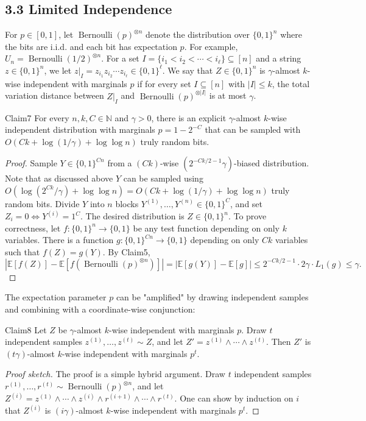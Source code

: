 \subsection*{3.3 Limited Independence}
For $p\in[0,1]$, let $\operatorname{Bernoulli}(p)^{\otimes n}$ denote the distribution over $\{0,1\}^n$ where the bits are i.i.d. and each bit has expectation $p$. For example, $U_n=\operatorname{Bernoulli}(1/2)^{\otimes n}$. For a set $I=\{i_1<i_2<\cdots<i_\ell\}\subseteq[n]$ and a string $z\in\{0,1\}^n$, we let $z|_I=z_{i_1}z_{i_2}\cdots z_{i_\ell}\in\{0,1\}^\ell$. We say that $Z\in\{0,1\}^n$ is $\gamma$-almost $k$-wise independent with marginals $p$ if for every set $I\subseteq[n]$ with $|I|\le k$, the total variation distance between $Z|_I$ and $\operatorname{Bernoulli}(p)^{\otimes|I|}$ is at most $\gamma$.
\begin{authorclaim}{Claim7}
For every $n,k,C\in\mathbb N$ and $\gamma>0$, there is an explicit $\gamma$-almost $k$-wise independent distribution with marginals $p=1-2^{-C}$ that can be sampled with $O(Ck+\log(1/\gamma)+\log\log n)$ truly random bits.
\end{authorclaim}
\begin{proof}
Sample $Y\in\{0,1\}^{Cn}$ from a $(Ck)$-wise $(2^{-Ck/2-1}\gamma)$-biased distribution. Note that as discussed above $Y$ can be sampled using $O(\log(2^{Ck}/\gamma)+\log\log n)=O(Ck+\log(1/\gamma)+\log\log n)$ truly random bits. Divide $Y$ into $n$ blocks $Y^{(1)},\ldots,Y^{(n)}\in\{0,1\}^C$, and set $Z_i=0\Longleftrightarrow Y^{(i)}=1^C$. The desired distribution is $Z\in\{0,1\}^n$.
To prove correctness, let $f:\{0,1\}^n\to\{0,1\}$ be any test function depending on only $k$ variables. There is a function $g:\{0,1\}^{Cn}\to\{0,1\}$ depending on only $Ck$ variables such that $f(Z)=g(Y)$. By Claim5,
\[
|\mathbb E[f(Z)]-\mathbb E[f(\operatorname{Bernoulli}(p)^{\otimes n})]|
=|\mathbb E[g(Y)]-\mathbb E[g]|
\le2^{-Ck/2-1}\cdot2\gamma\cdot L_1(g)\le\gamma.
\]
\end{proof}
The expectation parameter $p$ can be "amplified" by drawing independent samples and combining with a coordinate-wise conjunction:
\begin{authorclaim}{Claim8}
Let $Z$ be $\gamma$-almost $k$-wise independent with marginals $p$. Draw $t$ independent samples $z^{(1)},\ldots,z^{(t)}\sim Z$, and let $Z'=z^{(1)}\wedge\cdots\wedge z^{(t)}$. Then $Z'$ is $(t\gamma)$-almost $k$-wise independent with marginals $p^t$.
\end{authorclaim}
\begin{proof}[Proof sketch]
The proof is a simple hybrid argument. Draw $t$ independent samples $r^{(1)},\ldots,r^{(t)}\sim\operatorname{Bernoulli}(p)^{\otimes n}$, and let $Z^{(i)}=z^{(1)}\wedge\cdots\wedge z^{(i)}\wedge r^{(i+1)}\wedge\cdots\wedge r^{(t)}$. One can show by induction on $i$ that $Z^{(i)}$ is $(i\gamma)$-almost $k$-wise independent with marginals $p^t$.
\end{proof}
